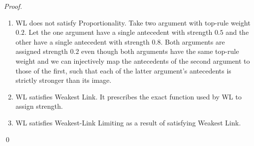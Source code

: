 \documentclass[runningheads]{llncs}
\begin{document}
\begin{proof}
\begin{enumerate}
    \item WL does not satisfy Proportionality. Take two argument with top-rule weight $0.2$. Let the one argument have a single antecedent with strength $0.5$ and the other have a single antecedent with strength $0.8$. Both arguments are assigned strength $0.2$ even though both arguments have the same top-rule weight and we can injectively map the antecedents of the second argument to those of the first, such that each of the latter argument's antecedents is strictly stronger than its image.
    \item WL satisfies Weakest Link. It prescribes the exact function used by WL to assign strength.
    \item WL satisfies Weakest-Link Limiting as a result of satisfying Weakest Link.
\end{enumerate}
\qed\end{proof}
\end{document}

